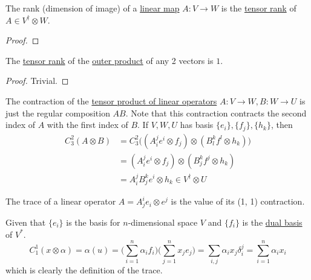 	\begin{theorem}
	  \label{thm:rank-of-linear-maps}
	  The rank (dimension of image) of a \hyperref[def:linear_map]{linear map} $A: V \to W$ is the \hyperref[def:tensor-rank]{tensor rank} of $A \in V^\dagger \otimes W$. 
	\end{theorem}
	\begin{proof}
	  
	\end{proof}

  \begin{corollary}
    \label{thm:outer-products-have-tensor-rank-one}
    The \hyperref[def:tensor-rank]{tensor rank} of the \hyperref[def:outer-product]{outer product} of any 2 vectors is $1$. 
  \end{corollary}
  \begin{proof}
    Trivial.
  \end{proof}

	\begin{example}
	  \label{ex:composition-of-linear-maps}
		The contraction of the \hyperref[def:tensor-product-of-linear-operators]{tensor product of linear operators} $A: V \to W, B: W \to U$ is just the regular composition $A B$. Note that this contraction contracts the second index of $A$ with the first index of $B$. If $V, W, U$ has basis $\{e_i\}, \{f_j\}, \{h_k\}$, then 
		\begin{align}
			C^2_3 (A \otimes B) & = C^2_3 \big( (A_i^j e^i \otimes f_j) \otimes (B_l^k f^l \otimes h_k ) \big) \\ 
													& = (A_i^j e^i \otimes f_j) \otimes (B_j^k f^j \otimes h_k ) \\ 
													& = A_i^j B_j^k e^i \otimes h_k \in V^\dagger \otimes U
		\end{align}
	\end{example}

	\begin{definition}[Trace]
	  \label{def:trace}
	  The trace of a linear operator $A = A^i_j e_i \otimes e^j$ is the value of its (1, 1) contraction. 

    Given that $\{e_i\}$ is the basis for $n$-dimensional space $V$ and $\{f_i\}$ is the \hyperref[def:dual-basis]{dual basis} of $V^*$.
    \begin{equation}
      C^1_1 (x \otimes \alpha) = \alpha (u) = \Big( \sum_{i=1}^n \alpha_i f_i  \Big) \Big( \sum_{j=1}^n x_j e_j \Big)  = \sum_{i, j} \alpha_i x_j \delta^j_i = \sum_{i=1}^n \alpha_i x_i 
    \end{equation}
    which is clearly the definition of the trace. 
	\end{definition}

